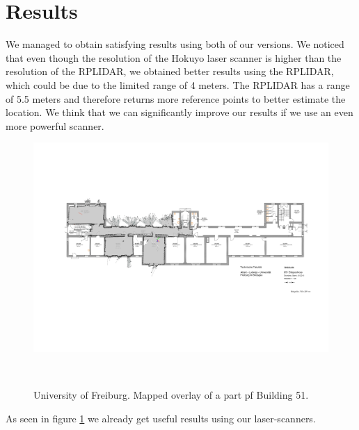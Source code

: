 \documentclass{sigchi-ext}
\begin{document}
\section{Results}
We managed to obtain satisfying results using both of our versions. We noticed that even though the resolution of the Hokuyo laser scanner is higher than the resolution of the RPLIDAR, we obtained better results using the RPLIDAR, which could be due to the limited range of 4 meters. The RPLIDAR has a range of 5.5 meters and therefore returns more reference points to better estimate the location. We think that we can significantly improve our results if we use an even more powerful scanner.
\begin{figure}
	\includegraphics[width=\textwidth]{51.png}
	\caption{University of Freiburg. Mapped overlay of a part pf Building 51.}~\label{fig:b51map}
\end{figure}
As seen in figure \ref{fig:b51map} we already get useful results using our laser-scanners. 
%
%

\balance{} 
\end{document}

